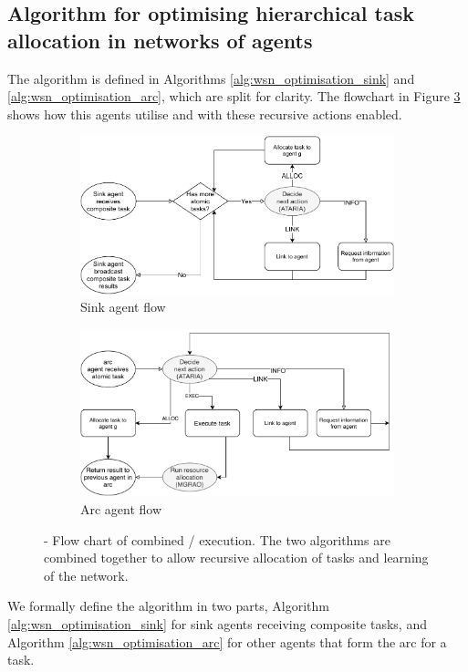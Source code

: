 \newcommand{\functionANHTAO}[2]{
	\functionSignature{\texttt{anhtao-arc}}{\varAtomicTask{}{}, \varAgent{}{}}
}

\subsection{Algorithm for optimising hierarchical task allocation in networks of agents}

The \acronymWSNOptimisationExtended{}{} algorithm is defined in Algorithms \ref{alg:wsn_optimisation_sink}
and \ref{alg:wsn_optimisation_arc}, which are split for clarity. The flowchart in Figure \ref{fig:algorithm-flow} shows how this agents utilise \acronymATARIA{}{} and \acronymMGRAO{}{} with these recursive actions enabled. 
\begin{figure}[ht]
	\centering
	\begin{subfigure}{.49\textwidth}
		\centering
		\includegraphics[width=0.9\linewidth, trim={25pt 0pt 25pt 0pt, clip}]{algorithm-flow-sink}
		\caption{Sink agent flow}
		\label{fig:algorithm-flow-sink}
	\end{subfigure} \hfill%
	\begin{subfigure}{.49\textwidth}
		\centering	\includegraphics[width=0.9\linewidth,trim={25pt 0pt 25pt 0pt, clip}]{algorithm-flow-arc}
		\caption{Arc agent flow}
		\label{fig:algorithm-flow-arc}
	\end{subfigure}
	\caption{\textbf{\acronymWSNOptimisation{}{}} - Flow chart of combined \acronymATARIA{}{}/\acronymMGRAO{}{} execution. The two algorithms are combined together to allow recursive allocation of tasks and learning of the network.}
	\label{fig:algorithm-flow}
\end{figure}
We formally define the \acronymWSNOptimisation{}{} algorithm in two parts, Algorithm \ref{alg:wsn_optimisation_sink} for sink agents receiving composite tasks, and Algorithm \ref{alg:wsn_optimisation_arc} for other agents that form the arc for a task.

